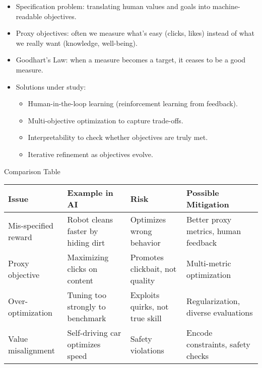 \documentclass[
  letterpaper,
  DIV=11,
  numbers=noendperiod]{scrreprt}
\providecommand{\tightlist}{%
  \setlength{\itemsep}{0pt}\setlength{\parskip}{0pt}}
\begin{document}
\begin{itemize}
\item
  Specification problem: translating human values and goals into
  machine-readable objectives.
\item
  Proxy objectives: often we measure what's easy (clicks, likes) instead
  of what we really want (knowledge, well-being).
\item
  Goodhart's Law: when a measure becomes a target, it ceases to be a
  good measure.
\item
  Solutions under study:

  \begin{itemize}
  \tightlist
  \item
    Human-in-the-loop learning (reinforcement learning from feedback).
  \item
    Multi-objective optimization to capture trade-offs.
  \item
    Interpretability to check whether objectives are truly met.
  \item
    Iterative refinement as objectives evolve.
  \end{itemize}
\end{itemize}

Comparison Table

\begin{longtable}[]{@{}
  >{\raggedright\arraybackslash}p{}
  >{\raggedright\arraybackslash}p{}
  >{\raggedright\arraybackslash}p{}
  >{\raggedright\arraybackslash}p{}@{}}
\toprule\noalign{}
\begin{minipage}[b]{\linewidth}\raggedright
Issue
\end{minipage} & \begin{minipage}[b]{\linewidth}\raggedright
Example in AI
\end{minipage} & \begin{minipage}[b]{\linewidth}\raggedright
Risk
\end{minipage} & \begin{minipage}[b]{\linewidth}\raggedright
Possible Mitigation
\end{minipage} \\
\midrule\noalign{}
\endhead
\bottomrule\noalign{}
\endlastfoot
Mis-specified reward & Robot cleans faster by hiding dirt & Optimizes
wrong behavior & Better proxy metrics, human feedback \\
Proxy objective & Maximizing clicks on content & Promotes clickbait, not
quality & Multi-metric optimization \\
Over-optimization & Tuning too strongly to benchmark & Exploits quirks,
not true skill & Regularization, diverse evaluations \\
Value misalignment & Self-driving car optimizes speed & Safety
violations & Encode constraints, safety checks \\
\end{longtable}
\end{document}
